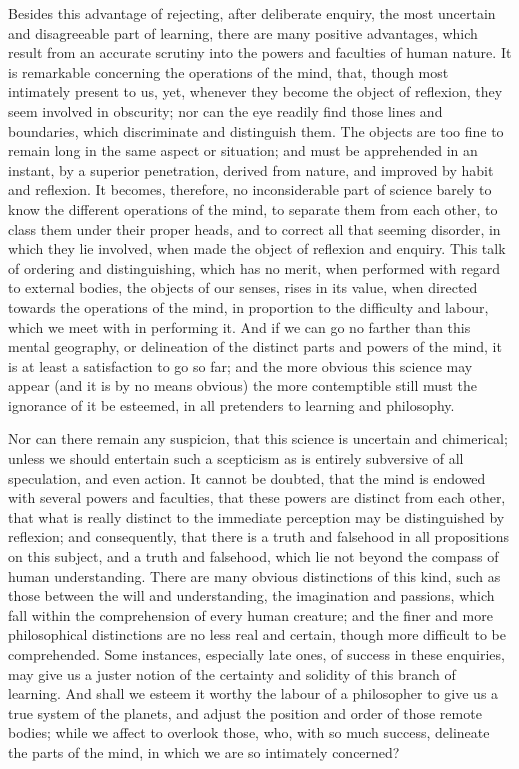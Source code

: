 \documentclass[]{article}
\begin{document}
\begin{sectionbody}
\humeparagraph  Besides this advantage of rejecting, after deliberate enquiry, the most uncertain and disagreeable part of learning, there are many positive advantages, which result from an accurate scrutiny into the powers and faculties of human nature. It is remarkable concerning the operations of the mind, that, though most intimately present to us, yet, whenever they become the object of reflexion, they seem involved in obscurity; nor can the eye readily find those lines and boundaries, which discriminate and distinguish them. The objects are too fine to remain long in the same aspect or situation; and must be apprehended in an instant, by a superior penetration, derived from nature, and improved by habit and reflexion. It becomes, therefore, no inconsiderable part of science barely to know the different operations of the mind, to separate them from each other, to class them under their proper heads, and to correct all that seeming disorder, in which they lie involved, when made the object of reflexion and enquiry. This talk of ordering and distinguishing, which has no merit, when performed with regard to external bodies, the objects of our senses, rises in its value, when directed towards the operations of the mind, in proportion to the difficulty and labour, which we meet with in performing it. And if we can go no farther than this mental geography, or delineation of the distinct parts and powers of the mind, it is at least a satisfaction to go so far; and the more obvious this science may appear (and it is by no means obvious) the more contemptible still must the ignorance of it be esteemed, in all pretenders to learning and philosophy.

\humeparagraph  Nor can there remain any suspicion, that this science is uncertain and chimerical; unless we should entertain such a scepticism as is entirely subversive of all speculation, and even action. It cannot be doubted, that the mind is endowed with several powers and faculties, that these powers are distinct from each other, that what is really distinct to the immediate perception may be distinguished by reflexion; and consequently, that there is a truth and falsehood in all propositions on this subject, and a truth and falsehood, which lie not beyond the compass of human understanding. There are many obvious distinctions of this kind, such as those between the will and understanding, the imagination and passions, which fall within the comprehension of every human creature; and the finer and more philosophical distinctions are no less real and certain, though more difficult to be comprehended. Some instances, especially late ones, of success in these enquiries, may give us a juster notion of the certainty and solidity of this branch of learning. And shall we esteem it worthy the labour of a philosopher to give us a true system of the planets, and adjust the position and order of those remote bodies; while we affect to overlook those, who, with so much success, delineate the parts of the mind, in which we are so intimately concerned?


\end{sectionbody}
\end{document}
